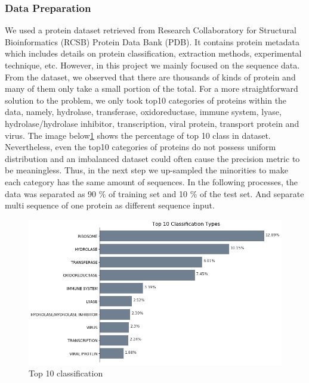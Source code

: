 \documentclass[sigconf]{acmart}
\begin{document}
\subsubsection{Data Preparation}
We used a protein dataset retrieved from Research Collaboratory for Structural Bioinformatics (RCSB) Protein Data Bank (PDB). It contains protein metadata which includes details on protein classification, extraction methods, experimental technique, etc. However, in this project we mainly focused on the sequence data. From the dataset, we observed that there are thousands of kinds of protein and many of them only take a small portion of the total. For a more straightforward solution to the problem, we only took top10 categories of proteins within the data, namely, hydrolase, transferase, oxidoreductase, immune system, lyase, hydrolase/hydrolase inhibitor, transcription, viral protein, transport protein and virus. The image below\ref{3} shows the percentage of top 10 class in dataset. Nevertheless, even the top10 categories of proteins do not possess uniform distribution and an imbalanced dataset could often cause the precision metric to be meaningless\cite{chawla2004special}. Thus, in the next step we up-sampled the minorities to make each category has the same amount of sequences. In the following processes, the data was separated as 90 \% of training set and 10 \% of the test set. And separate multi sequence of one protein as different sequence input.
\begin{figure}
  \centering
  \includegraphics[width=\linewidth]{3.png}
  \caption{Top 10 classification}
  \label{3}
\end{figure}
\end{document}
